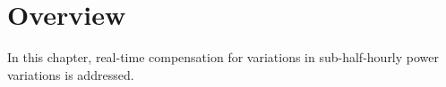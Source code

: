 \section{Overview}
\label{ch2:sec:overview}

In this chapter, real-time compensation for variations in sub-half-hourly power variations is addressed.